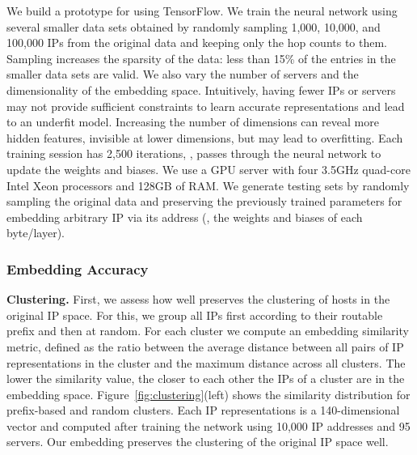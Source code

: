 We build a prototype for \system{} using TensorFlow. We train the neural network using several smaller data sets obtained by randomly sampling 1,000, 10,000, and 100,000 IPs from the original data and keeping only the hop counts to them. Sampling increases the sparsity of the data: less than 15\% of the entries in the smaller data sets are valid. We also vary the number of servers and the dimensionality of the embedding space. Intuitively, having fewer IPs or servers may not provide sufficient constraints to learn accurate representations and lead to an underfit model. Increasing the number of dimensions can reveal more hidden features, invisible at lower dimensions, but may lead to overfitting. Each training session has 2,500 iterations, \ie{}, passes through the neural network to update the weights and biases. We use a GPU server with four 3.5GHz quad-core Intel Xeon processors and 128GB of RAM. We generate testing sets by randomly sampling the original data and preserving the previously trained parameters for embedding arbitrary IP via its address (\eg{}, the weights and biases of each byte/layer).


\subsubsection{Embedding Accuracy}

\textbf{Clustering.} First, we assess how well \system{} preserves the clustering of hosts in the original IP space. For this, we group all IPs first according to their routable prefix and then at random. For each cluster we compute an embedding similarity metric, defined as the ratio between the average distance between all pairs of IP representations in the cluster and the maximum distance across all clusters. The lower the similarity value, the closer to each other the IPs of a cluster are in the embedding space. Figure~\ref{fig:clustering}(left) shows the similarity distribution for prefix-based and random clusters. Each IP representations is a 140-dimensional vector and computed after training the network using 10,000 IP addresses and 95 servers. Our embedding preserves the clustering of the original IP space well. 

